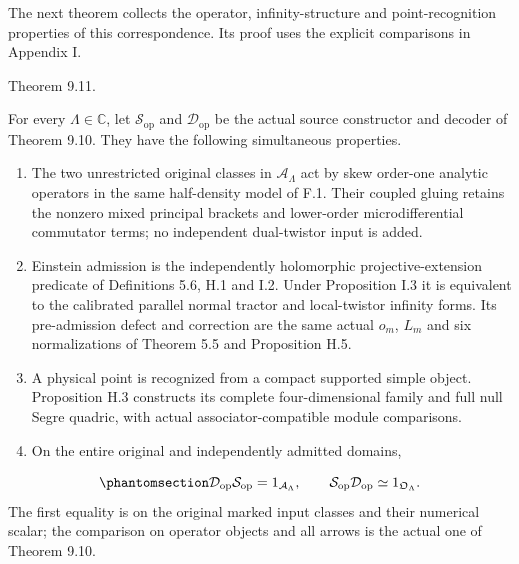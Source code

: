 \documentclass[
  english,
  11pt,
  reqno]{amsart}
\makeatletter
\providecommand{\tightlist}{%
  \setlength{\itemsep}{0pt}\setlength{\parskip}{0pt}}
\newcommand{\pandocstatementheading}[1]{%
  \par\addpenalty{\@beginparpenalty}%
  \addvspace{.5\baselineskip plus .2\baselineskip minus .2\baselineskip}%
  {\normalfont\bfseries #1\par}%
  \nobreak\@afterindenttrue\@afterheading
}
\makeatother
\begin{document}
The next theorem collects the operator, infinity-structure and
point-recognition properties of this correspondence. Its proof uses the
explicit comparisons in Appendix I.

\pandocstatementheading{\protect{}\label{thm:gg-original-positive-realization}

\protect\phantomsection\label{thm:gg-structured-googly-realization}Theorem 9.11.}

For every \(\Lambda\in\mathbb C\), let \(\mathcal S_{\mathrm{op}}\) and
\(\mathcal D_{\mathrm{op}}\) be the actual source constructor and
decoder of Theorem 9.10. They have the following simultaneous
properties.

\begin{enumerate}
\tightlist
\item
  The two unrestricted original classes in \(\mathcal A_\Lambda\) act by
  skew order-one analytic operators in the same half-density model of
  F.1. Their coupled gluing retains the nonzero mixed principal brackets
  and lower-order microdifferential commutator terms; no independent
  dual-twistor input is added.
\item
  Einstein admission is the independently holomorphic
  projective-extension predicate of Definitions 5.6, H.1 and I.2. Under
  Proposition I.3 it is equivalent to the calibrated parallel normal
  tractor and local-twistor infinity forms. Its pre-admission defect and
  correction are the same actual \(o_m\), \(L_m\) and six normalizations
  of Theorem 5.5 and Proposition H.5.
\item
  A physical point is recognized from a compact supported simple object.
  Proposition H.3 constructs its complete four-dimensional family and
  full null Segre quadric, with actual associator-compatible module
  comparisons.
\item
  On the entire original and independently admitted domains,
\end{enumerate}

\begin{equation}\protect\phantomsection\label{eq:gg-structured-source-operator-inverses}{
 \mathcal D_{\mathrm{op}}\mathcal S_{\mathrm{op}}=1_{\mathcal A_\Lambda},
 \qquad
 \mathcal S_{\mathrm{op}}\mathcal D_{\mathrm{op}}
                \simeq1_{\mathfrak O_\Lambda}.
}\end{equation} The first equality is on the original marked input
classes and their numerical scalar; the comparison on operator objects
and all arrows is the actual one of Theorem 9.10.
\end{document}
